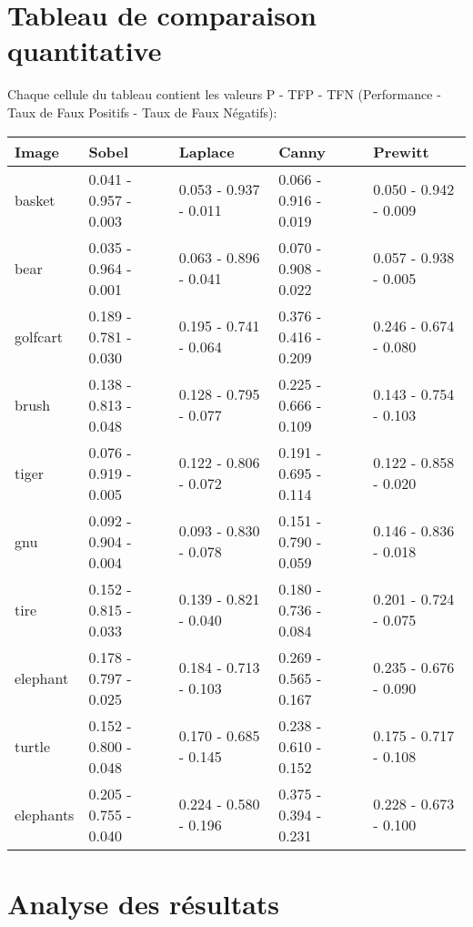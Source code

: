 \documentclass[article=a4, fontsize=11pt]{scrartcl}	%
\begin{document}
\section{Tableau de comparaison quantitative}
Chaque cellule du tableau contient les valeurs P - TFP - TFN (Performance - Taux de Faux Positifs - Taux de Faux Négatifs):
\begin{table}[!ht]
	\begin{center}
	    \begin{tabular}{ | l | l | l | l | l | }
	    	\hline
	    	Image & Sobel & Laplace & Canny & Prewitt\\
	    	\hline
			basket & 0.041 - 0.957 - 0.003 & 0.053 - 0.937 - 0.011 & 0.066 - 0.916 - 0.019 & 0.050 - 0.942 - 0.009 \\
			\hline
			bear &0.035 - 0.964 - 0.001 & 0.063 - 0.896 - 0.041 & 0.070 - 0.908 - 0.022 & 0.057 - 0.938 - 0.005 \\
			\hline
			golfcart & 0.189 - 0.781 - 0.030 & 0.195 - 0.741 - 0.064 & 0.376 - 0.416 - 0.209 & 0.246 - 0.674 - 0.080 \\
			\hline
			brush & 0.138 - 0.813 - 0.048 & 0.128 - 0.795 - 0.077 & 0.225 - 0.666 - 0.109 & 0.143 - 0.754 - 0.103 \\
			\hline
			tiger & 0.076 - 0.919 - 0.005 & 0.122 - 0.806 - 0.072 & 0.191 - 0.695 - 0.114 & 0.122 - 0.858 - 0.020 \\
			\hline
			gnu& 0.092 - 0.904 - 0.004 & 0.093 - 0.830 - 0.078 & 0.151 - 0.790 - 0.059 & 0.146 - 0.836 - 0.018 \\
			\hline
			tire & 0.152 - 0.815 - 0.033 & 0.139 - 0.821 - 0.040 & 0.180 - 0.736 - 0.084 & 0.201 - 0.724 - 0.075 \\
			\hline
			elephant & 0.178 - 0.797 - 0.025 & 0.184 - 0.713 - 0.103 & 0.269 - 0.565 - 0.167 & 0.235 - 0.676 - 0.090 \\
			\hline
			turtle & 0.152 - 0.800 - 0.048 & 0.170 - 0.685 - 0.145 & 0.238 - 0.610 - 0.152 & 0.175 - 0.717 - 0.108 \\
			\hline
			elephants &0.205 - 0.755 - 0.040 & 0.224 - 0.580 - 0.196 & 0.375 - 0.394 - 0.231 & 0.228 - 0.673 - 0.100 \\ 	    	
			\hline	    	
	    \end{tabular}
	\end{center}
\end{table}
\section{Analyse des résultats}
\end{document}
